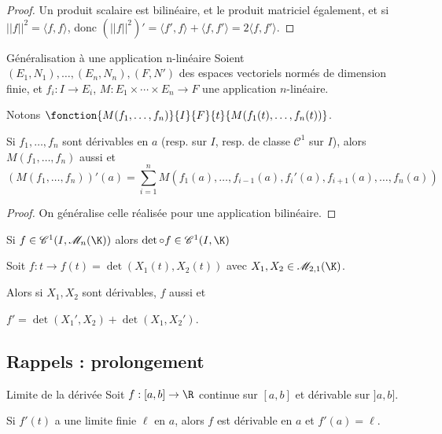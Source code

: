 
\begin{proof}
    Un produit scalaire est bilinéaire, et le produit matriciel également, et si 
    $||f||^2 = \langle f, f \rangle$, donc $(||f||^2)' = \langle f', f \rangle + \langle f, f' \rangle = 2 \langle f, f' \rangle$.
\end{proof}

\begin{theoreme}{Généralisation à une application n-linéaire}{}
    Soient $(E_1, N_1), \ldots, (E_n, N_n), (F, N')$ des espaces vectoriels normés de dimension finie, et
    $f_i : I \to E_i$, $M : E_1 \times \cdots \times E_n \to F$ une application $n$-linéaire.

    \avspace Notons $\fonction{M(f_1, \ldots, f_n)}{I}{F}{t}{M(f_1(t), \ldots, f_n(t))}$.

    \avspace Si $f_1, \ldots, f_n$ sont dérivables en $a$ (resp. sur $I$, resp. de classe $\mathscr C^1$ sur $I$),
    alors $M(f_1, \ldots, f_n)$ aussi et 
    $$(M(f_1, \ldots, f_n))'(a) = \sum_{i=1}^n M(f_1(a), \ldots, f_{i-1}(a), f_i'(a), f_{i+1}(a), \ldots, f_n(a))$$
\end{theoreme}

\begin{proof}
    On généralise celle réalisée pour une application bilinéaire.
\end{proof}

\begin{corollaire}{}{}
    Si $f \in \mathscr C^1(I, \mathscr M_n(\K))$ alors $\det \circ f \in \mathscr C^1(I, \K)$
\end{corollaire}

\begin{exemple}
    Soit $f: t \to f(t) = \det(X_1(t), X_2(t))$ avec $X_1, X_2 \in \mathscr M_{2, 1}(\K)$. 

    Alors si $X_1, X_2$ sont dérivables, $f$ aussi et 

    $f' = \det(X_1', X_2) + \det(X_1, X_2')$.
\end{exemple}

\subsection{Rappels : prolongement }

\begin{theoreme}{Limite de la dérivée}{}
    Soit $f : [a, b] \to \R$ continue sur $[a, b]$ et dérivable sur $]a, b]$. 

    Si $f'(t)$ a une limite finie $\ell$ en $a$, alors $f$ est dérivable en $a$ et $f'(a) = \ell$.

\end{theoreme}

